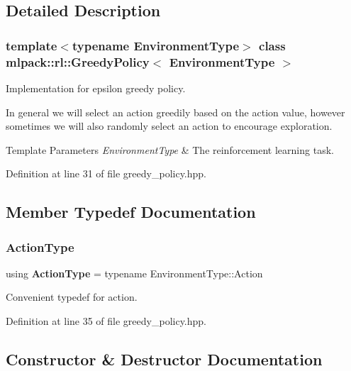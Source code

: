 \subsection{Detailed Description}
\subsubsection*{template$<$typename Environment\+Type$>$\newline
class mlpack\+::rl\+::\+Greedy\+Policy$<$ Environment\+Type $>$}

Implementation for epsilon greedy policy. 

In general we will select an action greedily based on the action value, however sometimes we will also randomly select an action to encourage exploration.


\begin{DoxyTemplParams}{Template Parameters}
{\em Environment\+Type} & The reinforcement learning task. \\
\hline
\end{DoxyTemplParams}


Definition at line 31 of file greedy\+\_\+policy.\+hpp.



\subsection{Member Typedef Documentation}
\mbox{\label{classmlpack_1_1rl_1_1GreedyPolicy_aaf7b2dc5d49d01961601c7c16be76777}} 
\subsubsection{Action\+Type}
{\footnotesize\ttfamily using \textbf{ Action\+Type} =  typename Environment\+Type\+::\+Action}



Convenient typedef for action. 



Definition at line 35 of file greedy\+\_\+policy.\+hpp.



\subsection{Constructor \& Destructor Documentation}
\mbox{\label{classmlpack_1_1rl_1_1GreedyPolicy_a7e04af56c8b5bb57890640e7fcb6b676}} 

